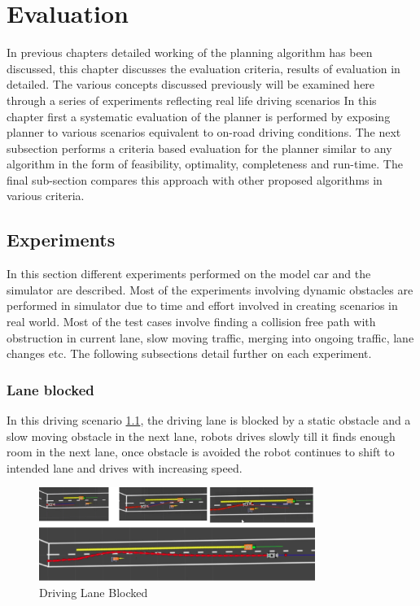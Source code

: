 \chapter{Evaluation}
\label{evaluation}
In previous chapters detailed working of the planning algorithm has been discussed, this chapter discusses the evaluation criteria, results of evaluation in detailed. The various concepts discussed previously will be examined here through a series of experiments reflecting real life driving scenarios 
In this chapter first a systematic evaluation of the planner is performed by exposing planner to various scenarios equivalent to on-road driving conditions. The next subsection performs a criteria based evaluation for the planner similar to any algorithm in the form of feasibility, optimality, completeness and run-time. The final sub-section compares this approach with other proposed algorithms in various criteria.  

\section{Experiments}\label{experiments}
In this section different experiments performed on the model car and the simulator are described. Most of the experiments involving dynamic obstacles are performed in simulator due to time and effort involved in creating scenarios in real world. Most of the test cases involve finding a collision free path with obstruction in current lane, slow moving traffic, merging into ongoing traffic, lane changes etc. The following subsections detail further on each experiment. 

\subsection{Lane blocked}
In this driving scenario  \ref{lane_blocked_1}, the driving lane is blocked by a static obstacle and a slow moving obstacle in the next lane, robots drives slowly till it finds enough room in the next lane, once obstacle is avoided the robot continues to shift to intended lane and drives with increasing speed. 

\begin{figure}[H]
    \centering
    \includegraphics[width=0.8\textwidth]{Images/evaluation/lane_blocked1.jpg}
    \caption{Driving Lane Blocked}
    \label{lane_blocked_1}
\end{figure}

